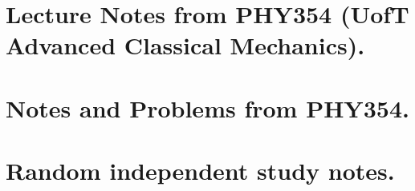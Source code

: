 \part{Lecture Notes from PHY354 (UofT Advanced Classical Mechanics).}





\part{Notes and Problems from PHY354.}


\part{Random independent study notes.}
















